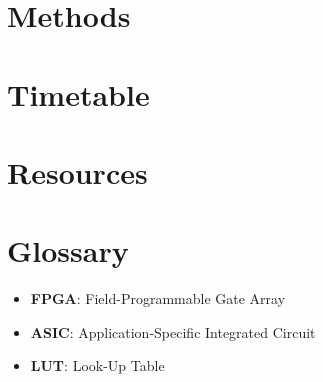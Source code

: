 \documentclass[12pt, a4paper, twoside]{IEEEtran}
\begin{document}
\section{Methods}
\label{methods}

\section{Timetable}
\label{timetable}

\section{Resources}
\label{resources}

\section{Glossary}
\label{glossary}
\begin{itemize}
  \item \textbf{FPGA}: Field-Programmable Gate Array
  \item \textbf{ASIC}: Application-Specific Integrated Circuit
  \item \textbf{LUT}: Look-Up Table
\end{itemize}




\end{document}

